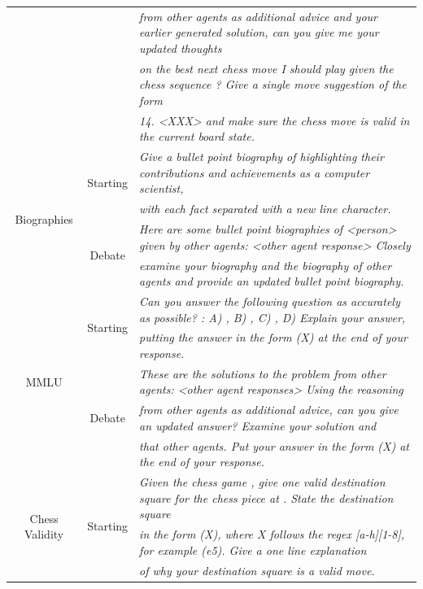 \begin{table}[t]
{\begin{tabular}{c|c|l}
       & & \emph{ from other agents as additional advice and your earlier generated solution,  can you give me your updated thoughts  } \\
       & & \emph{ on the best next chess move I should play given the chess sequence {}? Give a single move suggestion of the form} \\
       & & \emph{ 14. <XXX> and make sure the chess move is valid in the current board state.} \\
      \midrule
      \multirow{4}{*}{Biographies} & \multirow{2}{*}{Starting} & \emph{Give a bullet point biography of {} highlighting their contributions and achievements as a computer scientist,} \\
      & & \emph{with each fact separated with a new line character.} \\
     \cmidrule{2-3}
       & \multirow{2}{*}{Debate} & \emph{Here are some bullet point biographies of <person> given by other agents: <other agent response> Closely} \\
       & & \emph{ examine your biography and the biography of other agents and provide an updated bullet point biography.} \\
      \midrule
      \multirow{5}{*}{MMLU} & \multirow{2}{*}{Starting} & \emph{Can you answer the following question as accurately as possible? {}: A) {}, B) {}, C) {}, D) {} Explain your answer, } \\
      & & \emph{putting the answer in the form (X) at the end of your response.} \\
     \cmidrule{2-3}
       & \multirow{3}{*}{Debate} & \emph{These are the solutions to the problem from other agents: <other agent responses> Using the reasoning}\\
       & & \emph{ from other agents as additional advice, can you give an updated answer? Examine your solution and}\\
       & & \emph{ that other agents. Put your answer in the form (X) at the end of your response.} \\
      \midrule
      \multirow{6}{*}{Chess Validity} & \multirow{3}{*}{Starting} & \emph{Given the chess game {}, give one valid destination square for the chess piece at {}. State the destination square } \\
      & & \emph{in the form (X), where X follows the regex [a-h][1-8], for example (e5). Give a one line explanation } \\
      & & \emph{of why your destination square is a valid move.} \\

\end{tabular}}
\end{table}

